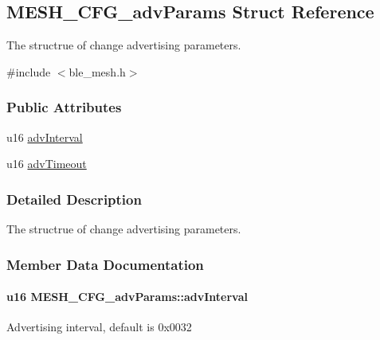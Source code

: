 \hypertarget{struct_m_e_s_h___c_f_g__adv_params}{}\subsection{M\+E\+S\+H\+\_\+\+C\+F\+G\+\_\+adv\+Params Struct Reference}
\label{struct_m_e_s_h___c_f_g__adv_params}


The structrue of change advertising parameters.  




{\ttfamily \#include $<$ble\+\_\+mesh.\+h$>$}

\subsubsection*{Public Attributes}
\begin{DoxyCompactItemize}
\item 
u16 \hyperlink{struct_m_e_s_h___c_f_g__adv_params_a8e6123b541bbab3eb2f45b35ced2266a}{adv\+Interval}
\item 
u16 \hyperlink{struct_m_e_s_h___c_f_g__adv_params_a55bea86d7bc1302a0b30a6b78d3ad1ba}{adv\+Timeout}
\end{DoxyCompactItemize}


\subsubsection{Detailed Description}
The structrue of change advertising parameters. 

\subsubsection{Member Data Documentation}
\paragraph[{\texorpdfstring{adv\+Interval}{advInterval}}]{\setlength{\rightskip}{0pt plus 5cm}u16 M\+E\+S\+H\+\_\+\+C\+F\+G\+\_\+adv\+Params\+::adv\+Interval}\hypertarget{struct_m_e_s_h___c_f_g__adv_params_a8e6123b541bbab3eb2f45b35ced2266a}{}\label{struct_m_e_s_h___c_f_g__adv_params_a8e6123b541bbab3eb2f45b35ced2266a}
Advertising interval, default is 0x0032 
